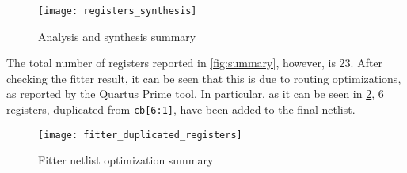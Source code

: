 \begin{figure}[!ht]
    \centering
    \texttt{[image: registers\_synthesis]}
    \caption{Analysis and synthesis summary}
    \label{fig:synthesizer_results_registers}
\end{figure}

The total number of registers reported in \cref{fig:summary}, however, is 23.
After checking the fitter result, it can be seen that this is due to routing optimizations, as reported by the Quartus Prime tool. In particular, as it can be seen in \cref{fig:fitter_duplicated_registers}, 6 registers, duplicated from \lstinline{cb[6:1]}, have been added to the final netlist.
\begin{figure}[!ht]
    \centering
    \texttt{[image: fitter\_duplicated\_registers]}
    \caption{Fitter netlist optimization summary}
    \label{fig:fitter_duplicated_registers}
\end{figure}

